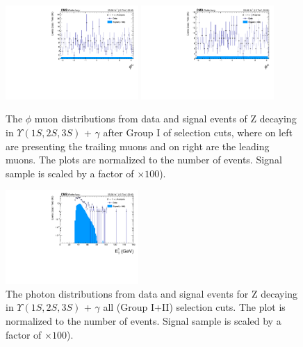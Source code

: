 \begin{figure}[!htbp]
\begin{center}
\includegraphics[width=0.45\textwidth]{figures_and_tables/outputPlots/ZtoUpsilon_Cat0_ZZZZZ/nEvts/data_x_mc/withKinCuts/h_withKin_TrailingMu_phi}\hspace*{1.cm}
\includegraphics[width=0.45\textwidth]{figures_and_tables/outputPlots/ZtoUpsilon_Cat0_ZZZZZ/nEvts/data_x_mc/withKinCuts/h_withKin_LeadingMu_phi}
\end{center}\vspace*{-.5cm}
\caption{The $\phi$ muon distributions from data and signal events of Z decaying in $\Upsilon(1S,2S,3S)$ + $\gamma$ after Group I of selection cuts, where on left are presenting the trailing muons and on right are the leading muons. The plots are normalized to the number of events. Signal sample is scaled by a factor of $\times 100$).}
\label{fig:phiMuons_ZtoUpsilon_Cat0_groupI_plus_II}
\end{figure}


\begin{figure}[!htbp]
\begin{center}
\includegraphics[width=0.45\textwidth]{figures_and_tables/outputPlots/ZtoUpsilon_Cat0_ZZZZZ/nEvts/data_x_mc/withKinCuts/h_withKin_Photon_pt}\hspace*{1.cm}
\end{center}\vspace*{-.5cm}
\caption{The \PT photon distributions from data and signal events for Z decaying in $\Upsilon(1S,2S,3S)$ + $\gamma$ all (Group I+II) selection cuts. The plot is normalized to the number of events. Signal sample is scaled by a factor of $\times 100$).}
\label{fig:pTPhoton_ZtoUpsilon_Cat0_groupI_plus_II}
\end{figure}


